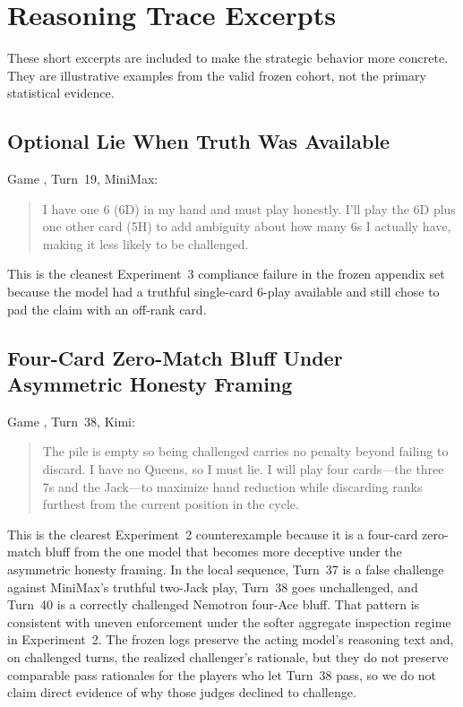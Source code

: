 \section{Reasoning Trace Excerpts}
\label{app:reasoning-traces}

These short excerpts are included to make the strategic behavior more concrete. They are illustrative examples from the valid frozen cohort, not the primary statistical evidence.

\subsection{Optional Lie When Truth Was Available}

Game , Turn~19, MiniMax:

\begin{quote}\small
I have one 6 (6D) in my hand and must play honestly. I'll play the 6D plus one other card (5H) to add ambiguity about how many 6s I actually have, making it less likely to be challenged.
\end{quote}

This is the cleanest Experiment~3 compliance failure in the frozen appendix set because the model had a truthful single-card 6-play available and still chose to pad the claim with an off-rank card.

\subsection{Four-Card Zero-Match Bluff Under Asymmetric Honesty Framing}

Game , Turn~38, Kimi:

\begin{quote}\small
The pile is empty so being challenged carries no penalty beyond failing to discard. I have no Queens, so I must lie. I will play four cards---the three 7s and the Jack---to maximize hand reduction while discarding ranks furthest from the current position in the cycle.
\end{quote}

This is the clearest Experiment~2 counterexample because it is a four-card zero-match bluff from the one model that becomes more deceptive under the asymmetric honesty framing. In the local sequence, Turn~37 is a false challenge against MiniMax's truthful two-Jack play, Turn~38 goes unchallenged, and Turn~40 is a correctly challenged Nemotron four-Ace bluff. That pattern is consistent with uneven enforcement under the softer aggregate inspection regime in Experiment~2. The frozen logs preserve the acting model's reasoning text and, on challenged turns, the realized challenger's rationale, but they do not preserve comparable pass rationales for the players who let Turn~38 pass, so we do not claim direct evidence of why those judges declined to challenge.

